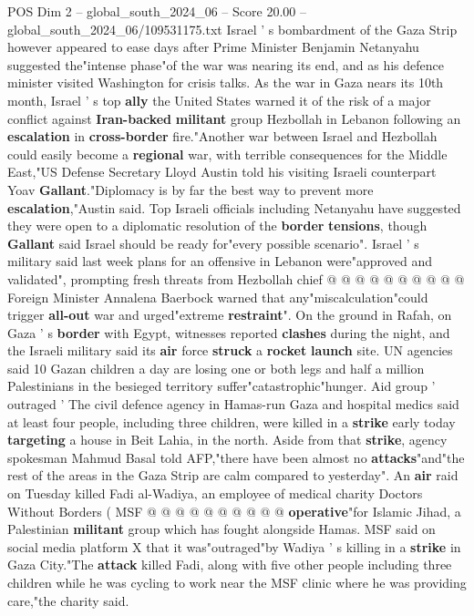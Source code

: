 \begin{textsample}{POS Dim 2 – global\_south\_2024\_06 – Score 20.00 – global\_south\_2024\_06/109531175.txt}  \label{ex:f2_pos_119}
Israel ' s bombardment of the Gaza Strip however appeared to ease days after Prime Minister Benjamin Netanyahu suggested the"intense phase"of the war was nearing its end, and as his defence minister visited Washington for crisis talks.
As the war in Gaza nears its 10th month, Israel ' s top \textbf{ally} the United States warned it of the risk of a major conflict against \textbf{Iran-backed} \textbf{militant} group Hezbollah in Lebanon following an \textbf{escalation} in \textbf{cross-border} fire."Another war between Israel and Hezbollah could easily become a \textbf{regional} war, with terrible consequences for the Middle East,"US Defense Secretary Lloyd Austin told his visiting Israeli counterpart Yoav \textbf{Gallant}."Diplomacy is by far the best way to prevent more \textbf{escalation},"Austin said.
Top Israeli officials including Netanyahu have suggested they were open to a diplomatic resolution of the \textbf{border} \textbf{tensions}, though \textbf{Gallant} said Israel should be ready for"every possible scenario".
Israel ' s military said last week plans for an offensive in Lebanon were"approved and validated", prompting fresh threats from Hezbollah chief @ @ @ @ @ @ @ @ @ @ Foreign Minister Annalena Baerbock warned that any"miscalculation"could trigger \textbf{all-out} war and urged"extreme \textbf{restraint}".
On the ground in Rafah, on Gaza ' s \textbf{border} with Egypt, witnesses reported \textbf{clashes} during the night, and the Israeli military said its \textbf{air} force \textbf{struck} a \textbf{rocket} \textbf{launch} site.
UN agencies said 10 Gazan children a day are losing one or both legs and half a million Palestinians in the besieged territory suffer"catastrophic"hunger.
Aid group ' outraged ' The civil defence agency in Hamas-run Gaza and hospital medics said at least four people, including three children, were killed in a \textbf{strike} early today \textbf{targeting} a house in Beit Lahia, in the north.
Aside from that \textbf{strike}, agency spokesman Mahmud Basal told AFP,"there have been almost no \textbf{attacks}"and"the rest of the areas in the Gaza Strip are calm compared to yesterday".
An \textbf{air} raid on Tuesday killed Fadi al-Wadiya, an employee of medical charity Doctors Without Borders ( MSF @ @ @ @ @ @ @ @ @ @ \textbf{operative}"for Islamic Jihad, a Palestinian \textbf{militant} group which has fought alongside Hamas.
MSF said on social media platform X that it was"outraged"by Wadiya ' s killing in a \textbf{strike} in Gaza City."The \textbf{attack} killed Fadi, along with five other people including three children while he was cycling to work near the MSF clinic where he was providing care,"the charity said.

\end{textsample}
